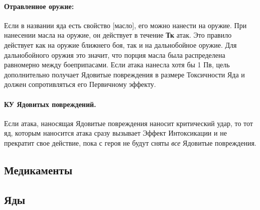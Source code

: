 \paragraph{Отравленное оружие:} Если в названии яда есть свойство [масло], его можно нанести на оружие.
\newline При нанесении масла на оружие, он действует в течение \textbf{Тк} атак. Это правило действует как на оружие ближнего боя, так и на дальнобойное оружие. Для дальнобойного оружия это значит, что порция масла была распределена равномерно между боеприпасами. Если атака нанесла хотя бы 1 Пв, цель дополнительно получает Ядовитые повреждения в размере Токсичности Яда и должен сопротивляться его Первичному эффекту.
\paragraph{КУ Ядовитых повреждений.} Если атака, наносящая Ядовитые повреждения наносит критический удар, то тот яд, которым наносится атака сразу вызывает Эффект Интоксикации и не прекратит свое действие, пока с героя не будут сняты \textit{все} Ядовитые повреждения.

\subsection{Медикаменты}
\subsection{Яды}

